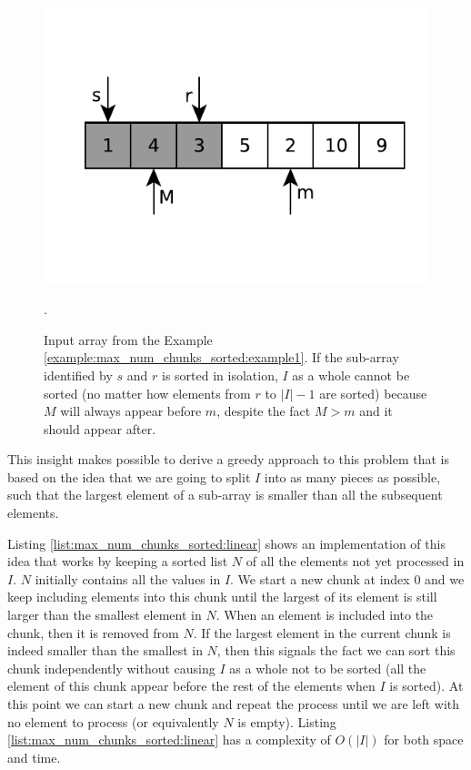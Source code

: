 \begin{figure}[b]
  \centering
   \includegraphics[width=\textwidth]{sources/max_num_chunks_sorted/images/example1}
   \caption[]{Input array from the Example \ref{example:max_num_chunks_sorted:example1}. If the 
   sub-array identified by $s$ and $r$ is sorted in isolation, $I$ as a whole cannot be sorted (no matter how elements from $r$ to $|I|-1$ are sorted)
   because $M$ will always appear before $m$, despite the fact $M>m$ and it should appear after.}.
   \label{fig:max_num_chunks_sorted:example1}
\end{figure}

This insight makes possible to derive a greedy approach to this problem that is based on the idea that we 
are going to split $I$ into as many pieces as possible, such that the largest element of a sub-array 
is smaller than all the subsequent elements. 

Listing \ref{list:max_num_chunks_sorted:linear} shows an implementation of this  idea that works by keeping a sorted list $N$
of all the elements not yet processed in $I$. $N$ initially contains all the values in $I$.
We start a new chunk at index $0$ and we keep including elements into this chunk until the largest
of its element is still larger than the smallest element in $N$.
When an element is included into the chunk, then it is removed from $N$.
If the largest element in the current chunk is indeed smaller than the smallest in $N$,
then this signals the fact we can sort this chunk independently without
causing $I$ as a whole not to be sorted (all the element of this chunk appear before the rest of the elements when $I$ is sorted).
At this point we can start a new chunk and repeat the process until
we are left with no element to process (or equivalently $N$ is empty).
Listing \ref{list:max_num_chunks_sorted:linear} has a complexity of $O(|I|)$  for both space and time. 

\begin{minipage}{\linewidth}
	
\end{minipage}